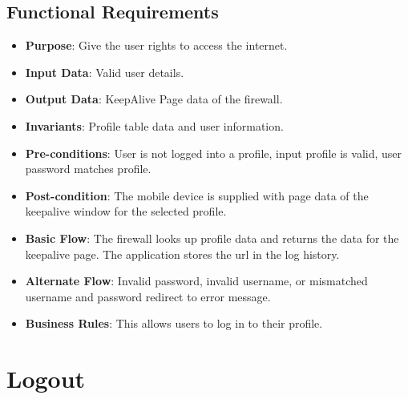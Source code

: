 \subsection{Functional Requirements}
\begin{itemize}
    \item \textbf{Purpose}: Give the user rights to access the internet.
    \item \textbf{Input Data}: Valid user details.
    \item \textbf{Output Data}: KeepAlive Page data of the firewall.
    \item \textbf{Invariants}: Profile table data and user information.
    \item \textbf{Pre-conditions}: User is not logged into a profile, input profile is valid, user password matches profile.
    \item \textbf{Post-condition}: The mobile device is supplied with page data of the keepalive window for the selected profile.
    \item \textbf{Basic Flow}: The firewall looks up profile data and returns the data for the keepalive page. The application stores the url in the log history.
    \item \textbf{Alternate Flow}: Invalid password, invalid username, or mismatched username and password redirect to error message.
    \item \textbf{Business Rules}: This allows users to log in to their profile.
\end{itemize}

\section{Logout}
